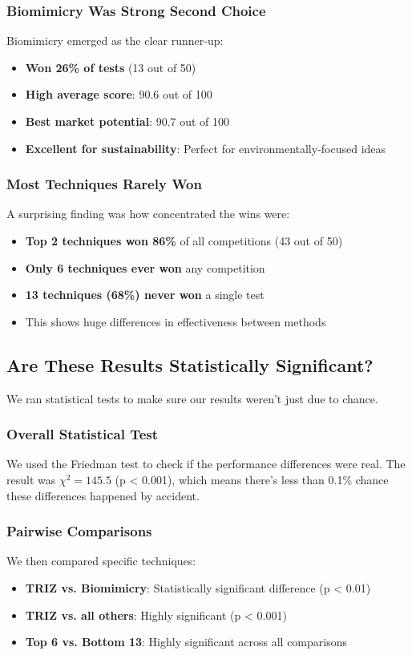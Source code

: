 \documentclass[12pt]{article}
\begin{document}
\subsubsection{Biomimicry Was Strong Second Choice}

Biomimicry emerged as the clear runner-up:
\begin{itemize}
\item \textbf{Won 26\% of tests} (13 out of 50)
\item \textbf{High average score}: 90.6 out of 100
\item \textbf{Best market potential}: 90.7 out of 100
\item \textbf{Excellent for sustainability}: Perfect for environmentally-focused ideas
\end{itemize}

\subsubsection{Most Techniques Rarely Won}

A surprising finding was how concentrated the wins were:
\begin{itemize}
\item \textbf{Top 2 techniques won 86\%} of all competitions (43 out of 50)
\item \textbf{Only 6 techniques ever won} any competition
\item \textbf{13 techniques (68\%) never won} a single test
\item This shows huge differences in effectiveness between methods
\end{itemize}

\subsection{Are These Results Statistically Significant?}

We ran statistical tests to make sure our results weren't just due to chance.

\subsubsection{Overall Statistical Test}
We used the Friedman test to check if the performance differences were real. The result was $\chi^2 = 145.5$ (p < 0.001), which means there's less than 0.1\% chance these differences happened by accident.

\subsubsection{Pairwise Comparisons}
We then compared specific techniques:
\begin{itemize}
\item \textbf{TRIZ vs. Biomimicry}: Statistically significant difference (p < 0.01)
\item \textbf{TRIZ vs. all others}: Highly significant (p < 0.001)
\item \textbf{Top 6 vs. Bottom 13}: Highly significant across all comparisons
\end{itemize}
\end{document}
